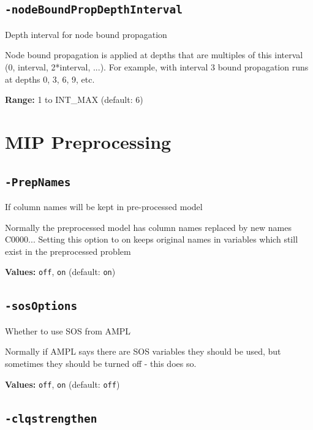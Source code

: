 \documentclass[11pt,a4paper]{article}
\begin{document}
\subsection*{\texttt{-nodeBoundPropDepthInterval}}

Depth interval for node bound propagation

Node bound propagation is applied at depths that are multiples of this interval (0, interval, 2*interval, ...). For example, with interval 3 bound propagation runs at depths 0, 3, 6, 9, etc.

\textbf{Range:} 1 to INT\_MAX (default: 6)

\section{MIP Preprocessing}

\subsection*{\texttt{-PrepNames}}

If column names will be kept in pre-processed model

Normally the preprocessed model has column names replaced by new names C0000... Setting this option to on keeps original names in variables which still exist in the preprocessed problem

\textbf{Values:} \texttt{off}, \texttt{on} (default: \texttt{on})

\subsection*{\texttt{-sosOptions}}

Whether to use SOS from AMPL

Normally if AMPL says there are SOS variables they should be used, but sometimes they should be turned off - this does so.

\textbf{Values:} \texttt{off}, \texttt{on} (default: \texttt{off})

\subsection*{\texttt{-clqstrengthen}}
\end{document}
